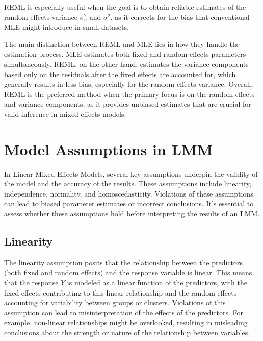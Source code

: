 REML is especially useful when the goal is to obtain reliable estimates of the random effects variance $\sigma_u^2$ and $\sigma^2$, as it corrects for the bias that conventional MLE might introduce in small datasets.

The main distinction between REML and MLE lies in how they handle the estimation process. MLE estimates both fixed and random effects parameters simultaneously. REML, on the other hand, estimates the variance components based only on the residuals after the fixed effects are accounted for, which generally results in less bias, especially for the random effects variance. Overall, REML is the preferred method when the primary focus is on the random effects and variance components, as it provides unbiased estimates that are crucial for valid inference in mixed-effects models.

\section{Model Assumptions in LMM}
In Linear Mixed-Effects Models, several key assumptions underpin the validity of the model and the accuracy of the results. These assumptions include linearity, independence, normality, and homoscedasticity. Violations of these assumptions can lead to biased parameter estimates or incorrect conclusions. It's essential to assess whether these assumptions hold before interpreting the results of an LMM.

\subsection*{Linearity}
The linearity assumption posits that the relationship between the predictors (both fixed and random effects) and the response variable is linear. This means that the response $Y$ is modeled as a linear function of the predictors, with the fixed effects contributing to this linear relationship and the random effects accounting for variability between groups or clusters. Violations of this assumption can lead to misinterpretation of the effects of the predictors. For example, non-linear relationships might be overlooked, resulting in misleading conclusions about the strength or nature of the relationship between variables.

